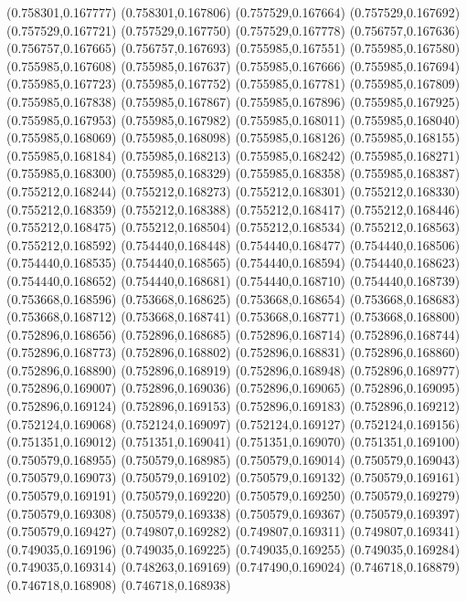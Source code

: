 (0.758301,0.167777)
(0.758301,0.167806)
(0.757529,0.167664)
(0.757529,0.167692)
(0.757529,0.167721)
(0.757529,0.167750)
(0.757529,0.167778)
(0.756757,0.167636)
(0.756757,0.167665)
(0.756757,0.167693)
(0.755985,0.167551)
(0.755985,0.167580)
(0.755985,0.167608)
(0.755985,0.167637)
(0.755985,0.167666)
(0.755985,0.167694)
(0.755985,0.167723)
(0.755985,0.167752)
(0.755985,0.167781)
(0.755985,0.167809)
(0.755985,0.167838)
(0.755985,0.167867)
(0.755985,0.167896)
(0.755985,0.167925)
(0.755985,0.167953)
(0.755985,0.167982)
(0.755985,0.168011)
(0.755985,0.168040)
(0.755985,0.168069)
(0.755985,0.168098)
(0.755985,0.168126)
(0.755985,0.168155)
(0.755985,0.168184)
(0.755985,0.168213)
(0.755985,0.168242)
(0.755985,0.168271)
(0.755985,0.168300)
(0.755985,0.168329)
(0.755985,0.168358)
(0.755985,0.168387)
(0.755212,0.168244)
(0.755212,0.168273)
(0.755212,0.168301)
(0.755212,0.168330)
(0.755212,0.168359)
(0.755212,0.168388)
(0.755212,0.168417)
(0.755212,0.168446)
(0.755212,0.168475)
(0.755212,0.168504)
(0.755212,0.168534)
(0.755212,0.168563)
(0.755212,0.168592)
(0.754440,0.168448)
(0.754440,0.168477)
(0.754440,0.168506)
(0.754440,0.168535)
(0.754440,0.168565)
(0.754440,0.168594)
(0.754440,0.168623)
(0.754440,0.168652)
(0.754440,0.168681)
(0.754440,0.168710)
(0.754440,0.168739)
(0.753668,0.168596)
(0.753668,0.168625)
(0.753668,0.168654)
(0.753668,0.168683)
(0.753668,0.168712)
(0.753668,0.168741)
(0.753668,0.168771)
(0.753668,0.168800)
(0.752896,0.168656)
(0.752896,0.168685)
(0.752896,0.168714)
(0.752896,0.168744)
(0.752896,0.168773)
(0.752896,0.168802)
(0.752896,0.168831)
(0.752896,0.168860)
(0.752896,0.168890)
(0.752896,0.168919)
(0.752896,0.168948)
(0.752896,0.168977)
(0.752896,0.169007)
(0.752896,0.169036)
(0.752896,0.169065)
(0.752896,0.169095)
(0.752896,0.169124)
(0.752896,0.169153)
(0.752896,0.169183)
(0.752896,0.169212)
(0.752124,0.169068)
(0.752124,0.169097)
(0.752124,0.169127)
(0.752124,0.169156)
(0.751351,0.169012)
(0.751351,0.169041)
(0.751351,0.169070)
(0.751351,0.169100)
(0.750579,0.168955)
(0.750579,0.168985)
(0.750579,0.169014)
(0.750579,0.169043)
(0.750579,0.169073)
(0.750579,0.169102)
(0.750579,0.169132)
(0.750579,0.169161)
(0.750579,0.169191)
(0.750579,0.169220)
(0.750579,0.169250)
(0.750579,0.169279)
(0.750579,0.169308)
(0.750579,0.169338)
(0.750579,0.169367)
(0.750579,0.169397)
(0.750579,0.169427)
(0.749807,0.169282)
(0.749807,0.169311)
(0.749807,0.169341)
(0.749035,0.169196)
(0.749035,0.169225)
(0.749035,0.169255)
(0.749035,0.169284)
(0.749035,0.169314)
(0.748263,0.169169)
(0.747490,0.169024)
(0.746718,0.168879)
(0.746718,0.168908)
(0.746718,0.168938)
